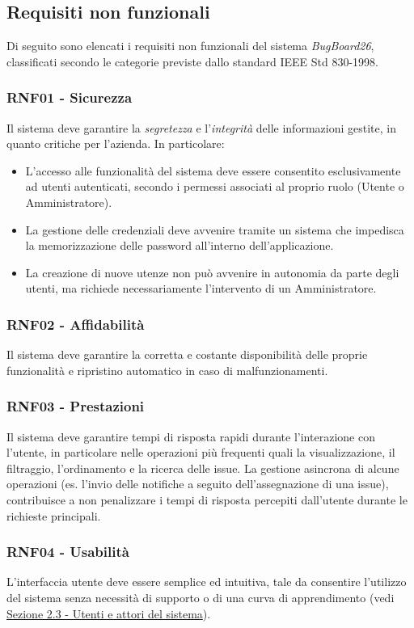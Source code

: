 \documentclass[a4paper,12pt]{article}
\begin{document}
\subsection{Requisiti non funzionali}

Di seguito sono elencati i requisiti non funzionali del sistema \textit{BugBoard26}, classificati secondo le categorie previste dallo standard IEEE Std 830-1998.

\subsubsection{RNF01 - Sicurezza}
Il sistema deve garantire la \textit{segretezza} e l'\textit{integrità} delle informazioni gestite, in quanto critiche per l'azienda. In particolare:
\begin{itemize}
    \item L'accesso alle funzionalità del sistema deve essere consentito esclusivamente ad utenti autenticati, secondo i permessi associati al proprio ruolo (Utente o Amministratore).
    \item La gestione delle credenziali deve avvenire tramite un sistema che impedisca la memorizzazione delle password all'interno dell'applicazione.
    \item La creazione di nuove utenze non può avvenire in autonomia da parte degli utenti, ma richiede necessariamente l'intervento di un Amministratore.
\end{itemize}

\subsubsection{RNF02 - Affidabilità}
Il sistema deve garantire la corretta e costante disponibilità delle proprie funzionalità e ripristino automatico in caso di malfunzionamenti.
\subsubsection{RNF03 - Prestazioni}
Il sistema deve garantire tempi di risposta rapidi durante l'interazione con l'utente, in particolare nelle operazioni più frequenti quali la visualizzazione, il filtraggio, l'ordinamento e la ricerca delle issue. La gestione asincrona di alcune operazioni (es. l'invio delle notifiche a seguito dell'assegnazione di una issue), contribuisce a non penalizzare i tempi di risposta percepiti dall'utente durante le richieste principali.

\subsubsection{RNF04 - Usabilità}
L'interfaccia utente deve essere semplice ed intuitiva, tale da consentire l'utilizzo del sistema senza necessità di supporto o di una curva di apprendimento (vedi \hyperref[sec:attori]{Sezione 2.3 - Utenti e attori del sistema}).
\end{document}
